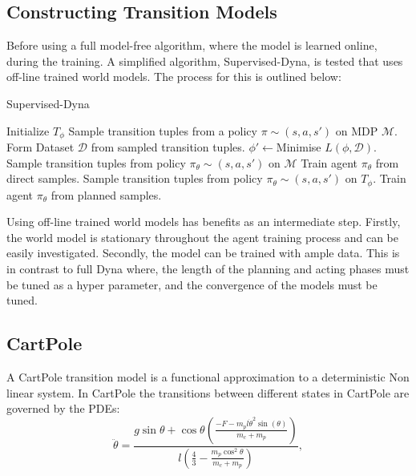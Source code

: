 \subsection{Constructing Transition Models}
Before using a full model-free algorithm, where the model is learned online, during the training. A simplified algorithm, Supervised-Dyna, is tested that uses off-line trained world models. The process for this is outlined below:
\begin{algorithm}
	\caption{Supervised-Dyna}
	\begin{algorithmic}
		\State Initialize $T_\phi$
		\State Sample transition tuples from a policy $\pi \sim (s, a, s')$ on MDP $\mathcal{M}$.
		\State Form Dataset $\mathcal{D}$ from sampled transition tuples.
		\State $\phi' \leftarrow $Minimise $L(\phi , \mathcal{D})$.
		\EndFor
		\State Sample transition tuples from policy $\pi_\theta \sim (s, a, s')$ on $\mathcal{M}$
		\State Train agent $\pi_\theta$ from direct samples.
		\EndFor
		\State Sample transition tuples from policy $\pi_\theta \sim (s, a, s')$ on $T_\phi$.
		\State Train agent $\pi_\theta$ from planned samples.
		\EndFor
		\EndFor
	\end{algorithmic}
\end{algorithm}

Using off-line trained world models has benefits as an intermediate step. Firstly, the world model is stationary throughout the agent training process and can be easily investigated. Secondly, the model can be trained with ample data. This is in contrast to full Dyna where, the length of the planning and acting phases must be tuned as a hyper parameter, and the convergence of the models must be tuned.

\subsection{CartPole}
A CartPole transition model is a functional approximation to a deterministic Non linear system. In CartPole the transitions between different states in CartPole are governed by the PDEs:
\begin{equation}
\ddot{\theta} = \frac{g \sin \theta + \cos\theta \left({\frac{-F - m_p l \dot{\theta}^2 \sin(\theta)}{m_c + m_p}} \right )}{l\left ( \frac{4}{3} - \frac{m_p \cos^2 \theta}{m_c + m_p}\right)},
\end {equation}

